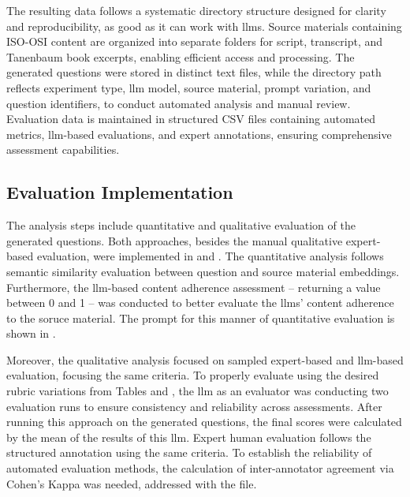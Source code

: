 The resulting data follows a systematic directory structure designed for clarity and reproducibility, as good as it can work with \ac{llms}. Source materials containing ISO-OSI content are organized into separate folders for script, transcript, and Tanenbaum book excerpts, enabling efficient access and processing. The generated questions were stored in distinct text files, while the directory path reflects experiment type, \ac{llm} model, source material, prompt variation, and question identifiers, to conduct automated analysis and manual review. Evaluation data is maintained in structured CSV files containing automated metrics, \ac{llm}-based evaluations, and expert annotations, ensuring comprehensive assessment capabilities.

\subsection{Evaluation Implementation}

The analysis steps include quantitative and qualitative evaluation of the generated questions. Both approaches, besides the manual qualitative expert-based evaluation, were implemented in  and . The quantitative analysis follows semantic similarity evaluation between question and source material embeddings. Furthermore, the \ac{llm}-based content adherence assessment -- returning a value between 0 and 1 -- was conducted to better evaluate the \ac{llms}' content adherence to the soruce material. The prompt for this manner of quantitative evaluation is shown in .

Moreover, the qualitative analysis focused on sampled expert-based and \ac{llm}-based evaluation, focusing the same criteria. To properly evaluate using the desired rubric variations from Tables  and , the \ac{llm} as an evaluator was conducting two evaluation runs to ensure consistency and reliability across assessments. After running this approach on the generated questions, the final scores were calculated by the mean of the results of this \ac{llm}. Expert human evaluation follows the structured annotation using the same criteria. To establish the reliability of automated evaluation methods, the calculation of inter-annotator agreement via Cohen's Kappa was needed, addressed with the  file.

